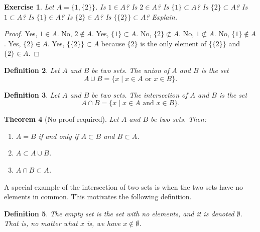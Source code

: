 \documentclass{amsart}
\newtheorem{theorem}{Theorem}
\newtheorem{definition}[theorem]{Definition}
\newtheorem{exercise}[theorem]{Exercise}
\newcommand{\1}{\mathds{1}}
\numberwithin{equation}{section}
\numberwithin{theorem}{section}
\begin{document}
\begin{exercise}
Let $A=\{1, \{2\}\}$.  Is $1\in A$?  Is $2\in A$?  Is $\{1\}\subset A$?  Is $\{2\}\subset A$?  
Is $1\subset A$?  Is $\{1\}\in A$?  Is $\{2\}\in A$?  Is $\{\{2\}\}\subset A$?  
Explain.

\end{exercise}

\begin{proof}
	Yes, $1\in A$. %
	No, $2\notin A$. %
	Yes, $\{1\}\subset A$. 
	No, $\{2\}\not\subset A$. %
	No, $1\not\subset A$. %
	No, $\{1\}\notin A$. %
	Yes, $\{2\}\in A$. %
	Yes, $\{\{2\}\}\subset A$ because $\{2\}$ is the only element of $\{\{2\}\}$ and $\{2\}\in A$.
\end{proof}

\begin{definition}  Let $A$ and $B$ be two sets. 
The \emph{union} of $A$ and $B$ is the set
\[
A \cup B = \{x \mid \text{$x \in A$ or $x \in B$} \}.
\]
\end{definition}

\begin{definition}  Let $A$ and $B$ be two sets. 
The \emph{intersection} of $A$ and $B$ is the set
\[
A \cap B = \{ x \mid \text{$x \in A$ and $x \in B$} \}.
\]
\end{definition}

\begin{theorem} [No proof required]
Let $A$ and $B$ be two sets.  Then:

\begin{enumerate} 
\item[a)]
$A=B$ if and only if $A\subset B$ and $B\subset A$.
\item[b)]
$A\subset A\cup B$.

\item[c)]
$A\cap B\subset A$.
\end{enumerate}
\end{theorem}

A special example of the intersection of two sets is when the two sets have no elements in common.
This motivates the following definition.

\begin{definition}  
The \emph{empty set} is the set with no elements, and it is denoted $\emptyset$.  That is,
no matter what $x$ is, we have $x\not\in \emptyset$.
\end{definition}  
\end{document}

